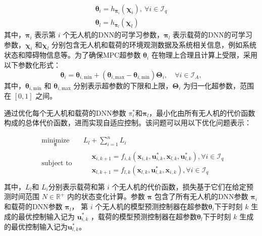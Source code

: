 \documentclass[lang=chs, degree=master, blindreview=false, winfonts=true]{yanputhesis}
\begin{document}
\begin{equation}
	\label{4}
	\begin{gathered}
		\boldsymbol{\theta}_i=h_{\boldsymbol{\pi}_i}\left(\boldsymbol{\chi}_i\right),\mathrm{~}\forall i\in\mathcal{I}_q\\    
		\boldsymbol{\theta}_l=h_{\boldsymbol{\pi}_l}\left(\boldsymbol{\chi}_l\right)
	\end{gathered}
\end{equation}
其中，\( \bm \pi_i \) 表示第 \(i\) 个无人机的DNN的可学习参数，\( \bm \pi_l \) 表示载荷的DNN的可学习参数，\( \bm \chi_i \) 和\( \bm \chi_l \) 分别包含无人机和载荷的环境观测数据及系统相关信息，例如系统状态和障碍物信息等。为了确保MPC超参数 \( \bm \theta_i \) 在物理上合理且计算上受限，采用以下参数化形式：
\begin{equation}
    \bm \theta_i = \bm \theta_{i,\text{min}} + \left( \bm \theta_{i,\text{max}} - \bm \theta_{i,\text{min}} \right) \bm \Theta_i, \quad \forall i \in \mathcal{I}_A,
\end{equation}
其中，\( \bm \theta_{i,\text{min}} \) 和 \( \bm \theta_{i,\text{max}} \) 分别表示超参数的下限和上限，\( \bm \Theta_i \) 为归一化超参数，范围在 \([\text{0}, \text{1}]\) 之间。

通过优化每个无人机和载荷的DNN参数 \( \pi_i^* \)和\(\bm \pi_l\)，最小化由所有无人机的代价函数构成的总体代价函数，进而实现自适应控制。该问题可以用以下优化问题表示：

\begin{equation}
	\begin{aligned} 
		&\operatorname*{minimize}_{\bm{\pi}} & & L_l+\sum_{i=1}^{n}L_i \\
		&\text{subject to} & & \begin{aligned}
			&\boldsymbol{x}_{i,{k+1}} = {{f}}_{i,k}\left(\boldsymbol{x}_{i,k}, \boldsymbol{u}^*_{i,{k}},  \boldsymbol{x}_{l,k}, \boldsymbol{u}^*_{l,{k}}\right), \forall i \in \mathcal{I}_q \\
			&\boldsymbol{x}_{l,{k+1}} = {{f}}_{l,k}\left(\boldsymbol{x}_{l,k}, \boldsymbol{u}^*_{{l},{k}},  \boldsymbol{x}_{i,k}\right), \forall i \in \mathcal{I}_q
		\end{aligned} \\
	\end{aligned}
\end{equation}
其中，$L_l $和 $L_i$分别表示载荷和第 \(i\) 个无人机的代价函数，损失基于它们在给定预测时间范围 \( N \in \mathbb{R}^+ \) 内的状态变化计算。参数 \(\bm \pi \) 包含了所有无人机的DNN参数 \( \bm \pi_i \)和载荷的DNN参数 \( \bm \pi_l \)，
第 \(i\) 个无人机的模型预测控制器在超参数\( \boldsymbol{\theta}_i \)下于时刻 \(k\) 生成的最优控制输入记为 \( \boldsymbol{u}^*_{i,{k}} \) ，载荷的模型预测控制器在超参数\( \boldsymbol{\theta}_l \)下于时刻 \(k\) 生成的最优控制输入记为\( \boldsymbol{u}^*_{l,{k}} \)。
\end{document}
